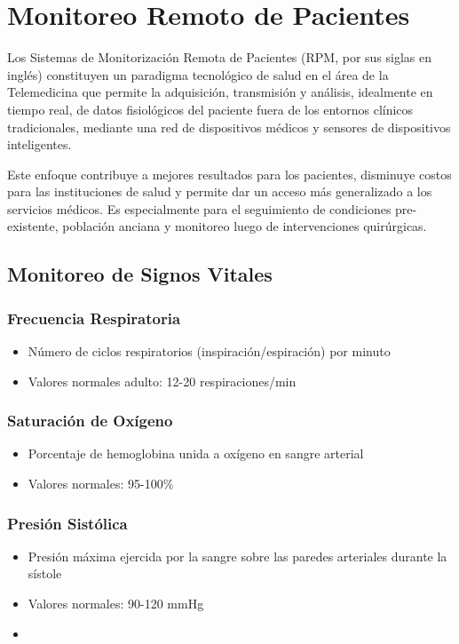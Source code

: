 \section{Monitoreo Remoto de Pacientes}

Los Sistemas de Monitorización Remota de Pacientes (RPM, por sus siglas en inglés) constituyen un paradigma tecnológico de salud en el área de la Telemedicina 
que permite la adquisición, transmisión y análisis, idealmente en tiempo real, de datos fisiológicos del paciente fuera de los entornos clínicos tradicionales, 
mediante una red de dispositivos médicos y sensores de dispositivos inteligentes. \newline

Este enfoque contribuye a mejores resultados para los pacientes, disminuye costos para las instituciones de salud y permite dar un acceso más 
generalizado a los servicios médicos. Es especialmente para el seguimiento de condiciones pre-existente,
población anciana y monitoreo luego de intervenciones quirúrgicas.\parencite{rpm_iot}


\subsection{Monitoreo de Signos Vitales}

\subsubsection{Frecuencia Respiratoria}
\begin{itemize}
    \item Número de ciclos respiratorios (inspiración/espiración) por minuto
    \item Valores normales adulto: 12-20 respiraciones/min
\end{itemize}

\subsubsection{Saturación de Oxígeno}
\begin{itemize}
    \item Porcentaje de hemoglobina unida a oxígeno en sangre arterial
    \item Valores normales: {95-100\%}
\end{itemize}

\subsubsection{Presión Sistólica}
\begin{itemize}
    \item Presión máxima ejercida por la sangre sobre las paredes arteriales durante la sístole
    \item Valores normales: 90-120 mmHg
    \item 
\end{itemize}

